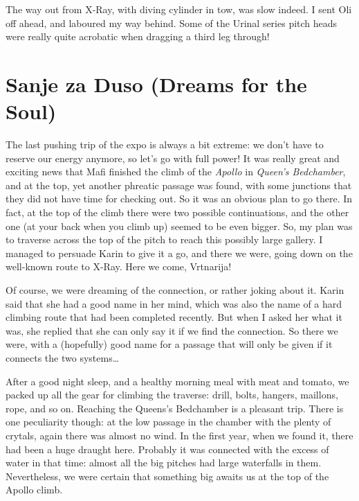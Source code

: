 The way out from X-Ray, with diving cylinder in tow, was slow indeed. I
sent Oli off ahead, and laboured my way behind. Some of the Urinal
series pitch heads were really quite acrobatic when dragging a third leg
through!


\hypertarget{sanje-za-duso-dreams-for-the-soul}{%
\section{Sanje za Duso (Dreams for the
Soul)}\label{sanje-za-duso-dreams-for-the-soul}}

The last pushing trip of the expo is always a bit extreme: we don't have
to reserve our energy anymore, so let's go with full power! It was
really great and exciting news that Mafi finished the climb of the
\emph{Apollo} in \emph{Queen's Bedchamber}, and at the top, yet another
phreatic passage was found, with some junctions that they did not have
time for checking out. So it was an obvious plan to go there. In fact,
at the top of the climb there were two possible continuations, and the
other one (at your back when you climb up) seemed to be even bigger. So,
my plan was to traverse across the top of the pitch to reach this
possibly large gallery. I managed to persuade Karin to give it a go, and
there we were, going down on the well-known route to X-Ray. Here we
come, Vrtnarija!

Of course, we were dreaming of the connection, or rather joking about
it. Karin said that she had a good name in her mind, which was also the
name of a hard climbing route that had been completed recently. But when
I asked her what it was, she replied that she can only say it if we find
the connection. So there we were, with a (hopefully) good name for a
passage that will only be given if it connects the two systems\ldots{}

After a good night sleep, and a healthy morning meal with meat and
tomato, we packed up all the gear for climbing the traverse: drill,
bolts, hangers, maillons, rope, and so on. Reaching the Queens's
Bedchamber is a pleasant trip. There is one peculiarity though: at the
low passage in the chamber with the plenty of crytals, again there was
almost no wind. In the first year, when we found it, there had been a
huge draught here. Probably it was connected with the excess of water in
that time: almost all the big pitches had large waterfalls in them.
Nevertheless, we were certain that something big awaits us at the top of
the Apollo climb.

